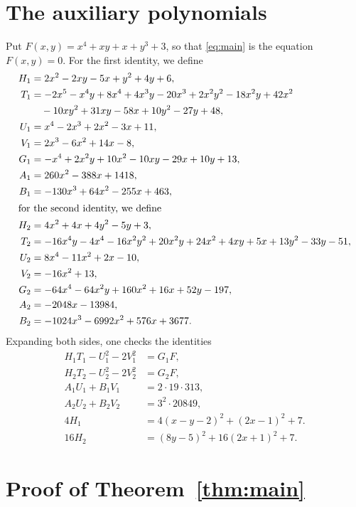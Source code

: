 \documentclass[11pt]{article}
\begin{document}
\section{The auxiliary polynomials}

Put $F(x,y)=x^{4}+xy+x+y^{3}+3$, so that \eqref{eq:main} is the equation $F(x,y)=0$.
For the first identity, we define
\begin{align*}
H_{1}&=2x^{2}-2xy-5x+y^{2}+4y+6,\\
T_{1}&=-2x^{5}-x^{4}y+8x^{4}+4x^{3}y-20x^{3}+2x^{2}y^{2}-18x^{2}y+42x^{2}\\
&\quad-10xy^{2}+31xy-58x+10y^{2}-27y+48,\\
U_{1}&=x^{4}-2x^{3}+2x^{2}-3x+11,\\
V_{1}&=2x^{3}-6x^{2}+14x-8,\\
G_{1}&=-x^{4}+2x^{2}y+10x^{2}-10xy-29x+10y+13,\\
A_{1}&=260x^{2}-388x+1418,\\
B_{1}&=-130x^{3}+64x^{2}-255x+463,\\
\intertext{for the second identity, we define}
H_{2}&=4x^{2}+4x+4y^{2}-5y+3,\\
T_{2}&=-16x^{4}y-4x^{4}-16x^{2}y^{2}+20x^{2}y+24x^{2}+4xy+5x+13y^{2}-33y-51,\\
U_{2}&=8x^{4}-11x^{2}+2x-10,\\
V_{2}&=-16x^{2}+13,\\
G_{2}&=-64x^{4}-64x^{2}y+160x^{2}+16x+52y-197,\\
A_{2}&=-2048x-13984,\\
B_{2}&=-1024x^{3}-6992x^{2}+576x+3677.
\end{align*}
Expanding both sides, one checks the identities
\begin{align}
H_{1}T_{1}-U_{1}^2-2V_{1}^2&=G_{1}F,\label{eq:norm1}\\
H_{2}T_{2}-U_{2}^2-2V_{2}^2&=G_{2}F,\label{eq:norm2}\\
A_{1}U_{1}+B_{1}V_{1}&=2\cdot 19\cdot 313,\label{eq:bez1}\\
A_{2}U_{2}+B_{2}V_{2}&=3^{2}\cdot 20849,\label{eq:bez2}\\
4H_{1}&=4(x-y-2)^2+(2x-1)^2+7.\label{eq:sign1}\\
16H_{2}&=(8y-5)^2+16(2x+1)^2+7.\label{eq:sign2}
\end{align}

\section{Proof of Theorem~\ref{thm:main}}
\end{document}

